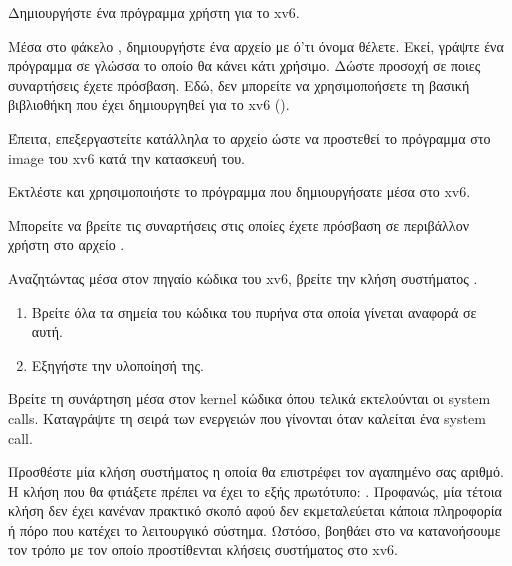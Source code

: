 \documentclass[18pt]{extarticle}
\begin{document}
\begin{question}
    Δημιουργήστε ένα πρόγραμμα χρήστη για το xv6.

    Μέσα στο φάκελο , δημιουργήστε ένα αρχείο με ό'τι όνομα θέλετε. Εκεί, γράψτε ένα πρόγραμμα
    σε γλώσσα  το οποίο θα κάνει κάτι χρήσιμο. Δώστε προσοχή 
    σε ποιες συναρτήσεις έχετε πρόσβαση. Εδώ, δεν μπορείτε να χρησιμοποήσετε τη βασική βιβλιοθήκη που έχει δημιουργηθεί για το xv6 ().

    Έπειτα, επεξεργαστείτε κατάλληλα το αρχείο  ώστε να προστεθεί το πρόγραμμα στο image του xv6 κατά την κατασκευή του.

    Εκτλέστε  και χρησιμοποιήστε το πρόγραμμα που δημιουργήσατε μέσα στο xv6.

    \begin{info}[Σημείωση:]
        Μπορείτε να βρείτε τις συναρτήσεις στις οποίες έχετε πρόσβαση σε περιβάλλον χρήστη στο αρχείο .
    \end{info}

\end{question}

\begin{question}
    Αναζητώντας μέσα στον πηγαίο κώδικα του xv6, βρείτε την 
    κλήση συστήματος .

    \begin{enumerate}
        \item Βρείτε όλα τα σημεία του κώδικα του πυρήνα στα οποία γίνεται αναφορά σε αυτή.
        \item Εξηγήστε την υλοποίησή της.
    \end{enumerate}
\end{question}

\begin{question}
    Βρείτε τη συνάρτηση μέσα στον kernel κώδικα όπου τελικά εκτελούνται οι system calls.
    Καταγράψτε τη σειρά των ενεργειών που γίνονται όταν καλείται ένα system call.
\end{question}

\begin{question}
    Προσθέστε μία κλήση συστήματος η οποία θα επιστρέφει τον αγαπημένο σας αριθμό.
    Η κλήση που θα φτιάξετε πρέπει να έχει το εξής πρωτότυπο: .
    Προφανώς, μία τέτοια κλήση δεν έχει κανέναν πρακτικό σκοπό αφού δεν εκμεταλεύεται κάποια πληροφορία ή 
    πόρο που κατέχει το λειτουργικό σύστημα. Ωστόσο, βοηθάει στο να κατανοήσουμε τον τρόπο με τον οποίο
    προστίθενται κλήσεις συστήματος στο xv6.
\end{question}
\end{document}
